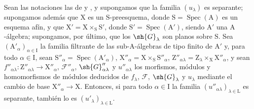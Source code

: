 \begin{lemma}[11.9.12]
\label{IV.11.9.12}
Sean las notaciones las de  y , y supongamos que la familia $(u_\lambda)$ es separante; supongamos además que $\mathrm{X}$ es un $\mathrm{S}$-preesquema, donde $\mathrm{S}=\operatorname{Spec}(\mathrm{A})$ es un esquema afín, y que $\mathrm{X}'=\mathrm{X}\times_\mathrm{S}\mathrm{S}'$, donde $\mathrm{S}'=\operatorname{Spec}(\mathrm{A}')$, siendo $\mathrm{A}'$ una $\mathrm{A}$-álgebra; supongamos, por último, que los $\sh{G}_\lambda$ son planos sobre $\mathrm{S}$.
Sea $(\mathrm{A}'_\alpha)_{\alpha\in\mathrm{I}}$ la familia filtrante de las sub-$\mathrm{A}$-álgebras de tipo finito de $\mathrm{A}'$ y, para todo $\alpha\in\mathrm{I}$, sean $\mathrm{S}''_\alpha=\operatorname{Spec}(\mathrm{A}'_\alpha)$, $\mathrm{X}''_\alpha=\mathrm{X}\times_\mathrm{S}\mathrm{S}''_\alpha$, $\mathrm{Z}''_{\alpha\lambda}=\mathrm{Z}_\lambda\times_\mathrm{X}\mathrm{X}''_\alpha$, y sean $f''_{\alpha\lambda}:\mathrm{Z}''_{\alpha\lambda}\to\mathrm{X}''_\alpha$, $\mathscr{F}''_\alpha$, $\sh{G}''_{\alpha\lambda}$ y $u''_{\alpha\lambda}$ los morfismos, módulos y homomorfismos de módulos deducidos de $f_\lambda$, $\mathscr{F}$, $\sh{G}_\lambda$ y $u_\lambda$ mediante el cambio de base $\mathrm{X}''_\alpha\to\mathrm{X}$.
Entonces, si para todo $\alpha\in\mathrm{I}$ la familia $(u''_{\alpha\lambda})_{\lambda\in\mathrm{L}}$ es separante, también lo es $(u'_\lambda)_{\lambda\in\mathrm{L}}$.
\end{lemma}

